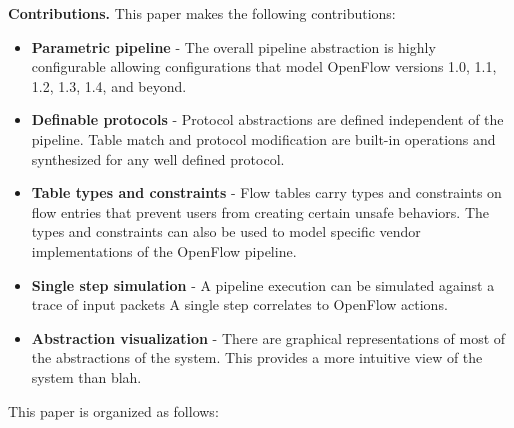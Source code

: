 
\textbf{Contributions.} This paper makes the following contributions:
\begin{itemize}
  \item \textbf{Parametric pipeline} - The overall pipeline abstraction is
        highly configurable allowing configurations that model OpenFlow 
        versions 1.0, 1.1, 1.2, 1.3, 1.4, and beyond.
  \item \textbf{Definable protocols} - Protocol abstractions are defined 
        independent of the pipeline. Table match and protocol modification are
        built-in operations and synthesized for any well defined protocol.
  \item \textbf{Table types and constraints} - Flow tables carry types and
        constraints on flow entries that prevent users from creating certain
        unsafe behaviors. The types and constraints can also be used to model
        specific vendor implementations of the OpenFlow pipeline.
  \item \textbf{Single step simulation} - A pipeline execution can be simulated
        against a trace of input packets A single step correlates to OpenFlow
        actions.
  \item \textbf{Abstraction visualization} - There are graphical representations
        of most of the abstractions of the system. This provides a more intuitive
        view of the system than blah.
\end{itemize}

This paper is organized as follows:
